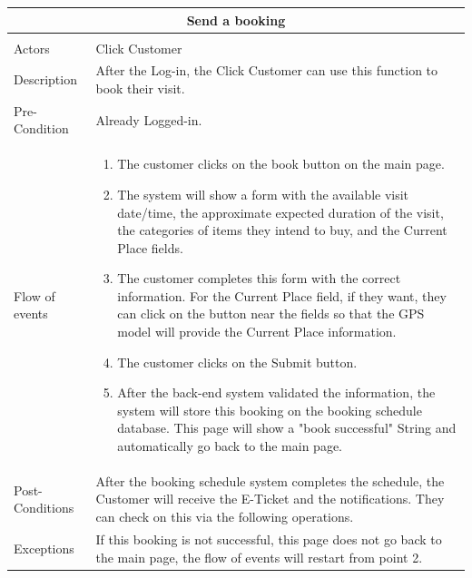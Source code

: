 \documentclass[a4paper,12pt]{report}
\begin{document}
\begin{center}
	\begin{tabular}{p{}|p{}}
		\multicolumn{2}{c}{\large \textbf{Send a booking}} \\[3mm] 
		\hline \\
		Actors &  Click Customer \\[3mm] 
		Description &   After the Log-in, the Click Customer can use this function to book their visit.\\[3mm]  
		Pre-Condition &  Already Logged-in. \\[3mm] 
		Flow of events & 
		\begin{enumerate}
			\item The customer clicks on the book button on the main page.
			\item The system will show a form with the available visit date/time, the approximate expected duration of the visit, the categories of items they intend to buy, and the Current Place fields.
			\item The customer completes this form with the correct information. For the Current Place field, if they want, they can click on the button near the fields so that the GPS model will provide the Current Place information. 
			\item The customer clicks on the Submit button.
			\item After the back-end system validated the information, the system will store this booking on the booking schedule database. This page will show a "book successful" String and automatically go back to the main page. 
		\end{enumerate}
		\\[3mm] 
		Post-Conditions & After the booking schedule system completes the schedule, the Customer will receive the E-Ticket and the notifications. They can check on this via the following operations.\\[3mm] 
		Exceptions & If this booking is not successful, this page does not go back to the main page, the flow of events will restart from point 2.\\[3mm] 
	\end{tabular}
\end{center}
\end{document}
